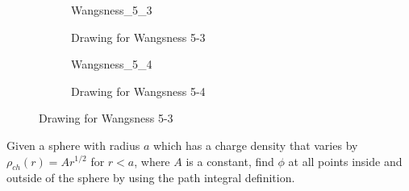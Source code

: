 \documentclass[crop=false,class=article,oneside]{standalone}
\begin{document}
    \begin{figure}[H]
        \centering
        \captionsetup{type=figure}
        \begin{subfigure}[b]{0.49\textwidth}
            \centering
            {Wangsness_5_3}
            \caption{Drawing for Wangsness 5-3}
        \end{subfigure}
        \begin{subfigure}[b]{0.49\textwidth}
            \centering
            {Wangsness_5_4}
            \label{fig:EMAG_Wangsness_5_4}
            \caption{Drawing for Wangsness 5-4}
        \end{subfigure}
        \caption{Drawing for Wangsness 5-3}
    \end{figure}
    \begin{problem}[Wangsness 5-10]
        Given a sphere with radius $a$ which has
        a charge density that varies by
        $\rho_{ch}(r)=Ar^{1/2}$ for $r<a$, where $A$
        is a constant, find $\phi$ at all points inside
        and outside of the sphere by using the path
        integral definition.
    \end{problem}
\end{document}
